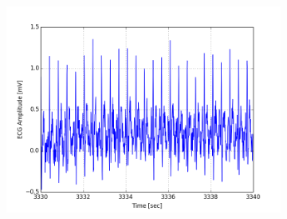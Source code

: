 \documentclass[paper=a4, fontsize=11pt]{scrartcl}
\numberwithin{equation}{section}		%
\numberwithin{figure}{section}			%
\numberwithin{table}{section}		    %
\begin{document}
\begin{appendices}
\begin{figure}[H]
\begin{subfigure}[b]{0.3\textwidth}
		\includegraphics[width=\textwidth]{sim/ecg_69}
	\end{subfigure}
\end{figure}


\end{appendices}
\end{document}
